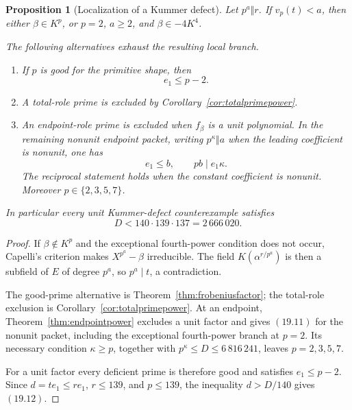 \documentclass[11pt]{article}
\newtheorem{proposition}[theorem]{Proposition}
\theoremstyle{definition}
\begin{document}
\begin{proposition}[Localization of a Kummer defect]
\label{prop:defectlocalization}
Let \(p^a\Vert r\).  If \(v_p(t)<a\), then either
\(\beta\in K^p\), or \(p=2\), \(a\geq2\), and
\(\beta\in-4K^4\).

The following alternatives exhaust the resulting local branch.
\begin{enumerate}[label=(\alph*)]
\item If \(p\) is good for the primitive shape, then
\begin{equation}
 e_1\leq p-2.
 \tag{19.10}
\end{equation}
\item A total-role prime is excluded by
Corollary~\ref{cor:totalprimepower}.
\item An endpoint-role prime is excluded when \(f_\beta\) is a unit
polynomial.  In the remaining nonunit endpoint packet, writing
\(p^\kappa\Vert a\) when the leading coefficient is nonunit, one has
\begin{equation}
 e_1\leq b,\qquad pb\mid e_1\kappa.
 \tag{19.11}
\end{equation}
The reciprocal statement holds when the constant coefficient is nonunit.
Moreover \(p\in\{2,3,5,7\}\).
\end{enumerate}
In particular every unit Kummer-defect counterexample satisfies
\begin{equation}
 D<140\cdot139\cdot137=2\,666\,020.
 \tag{19.12}
\end{equation}
\end{proposition}

\begin{proof}
If \(\beta\notin K^p\) and the exceptional fourth-power condition does not
occur, Capelli's criterion makes \(X^{p^a}-\beta\) irreducible.  The field
\(K(\alpha^{r/p^a})\) is then a subfield of \(E\) of degree \(p^a\), so
\(p^a\mid t\), a contradiction.

The good-prime alternative is Theorem~\ref{thm:frobeniusfactor}; the
total-role exclusion is Corollary~\ref{cor:totalprimepower}.  At an endpoint,
Theorem~\ref{thm:endpointpower} excludes a unit factor and gives
\((19.11)\) for the nonunit packet, including the exceptional fourth-power
branch at \(p=2\).  Its necessary condition \(\kappa\geq p\), together with
\(p^\kappa\leq D\leq6\,816\,241\), leaves
\(p=2,3,5,7\).

For a unit factor every deficient prime is therefore good and satisfies
\(e_1\leq p-2\).  Since \(d=te_1\leq re_1\), \(r\leq139\), and
\(p\leq139\), the inequality \(d>D/140\) gives \((19.12)\).
\end{proof}
\end{document}
